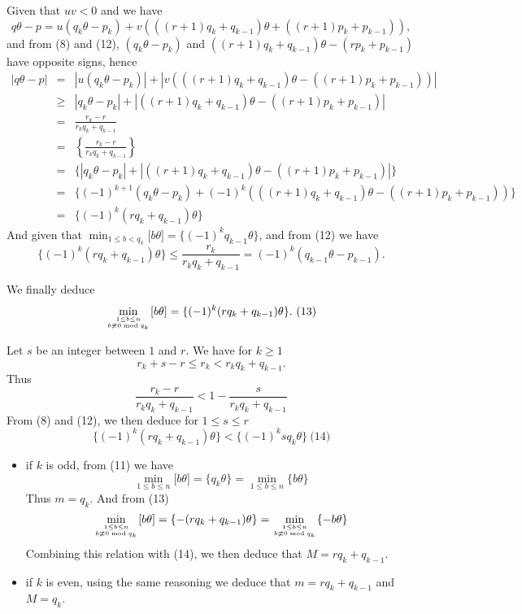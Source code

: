 \documentclass[a4paper,12pt]{article}
\begin{document}
Given that $uv<0$ and we have
\[ q\theta - p = u(q_k\theta - p_k) + v(((r+1)q_k+q_{k-1})\theta +
((r+1)p_k+ p_{k-1})),\]
and from (8) and (12), $(q_k\theta - p_k)$ and $((r+1)q_k+q_{k-1})\theta
- (rp_k + p_{k-1})$ have opposite signs, hence
\begin{eqnarray*}
  |q\theta - p| &=& |u(q_k\theta - p_k)| + |v(((r+1)q_k + q_{k-1})\theta -
  ((r+1)p_k + p_{k-1}))| \\
  &\ge& |q_k \theta - p_k| + |((r+1)q_k + q_{k-1})\theta - ((r+1)p_k +
  p_{k-1})| \\
  &=& \frac{r_k - r}{r_k q_k + q_{k-1}}\\
  &=& \left\{ \frac{r_k - r}{r_k q_k + q_{k-1}}\right\} \\
  &=& \{ |q_k \theta - p_k| + |((r+1)q_k + q_{k-1})\theta - ((r+1)p_k +
  p_{k-1})| \} \\
  &=& \{ (-1)^{k+1}(q_k\theta - p_k) + (-1)^k (((r+1)q_k +
  q_{k-1})\theta - ((r+1) p_k + p_{k-1}))\} \\
  &=& \{ (-1)^k(rq_k + q_{k-1})\theta\}
\end{eqnarray*}
And given that
$\min_{1\le b<q_k}\lbrack b\theta \rbrack = \{(-1)^{k}q_{k-1}\theta\}$,
and from (12) we have
\[ \{(-1)^k(rq_k + q_{k-1}) \theta\} \le \frac{r_k}{r_kq_k + q_{k-1}} =
(-1)^k (q_{k-1}\theta - p_{k-1}).\]

We finally deduce
\[ \min_{1\le b\le n\atop b \not\equiv 0 \bmod{q_k}}\lbrack
b\theta\rbrack = \{(-1)^k(rq_k + q_{k-1})\theta\}.\ (13)\]

Let $s$ be an integer between $1$ and $r$.  We have for $k\ge 1$
\[ r_k + s - r \le r_k < r_k q_k + q_{k-1}.\]
Thus
\[ \frac{r_k - r}{r_k q_k + q_{k-1}} < 1 - \frac{s}{r_k q_k +
  q_{k-1}}\]
From (8) and (12), we then deduce for $1\le s\le r$
\[ \{(-1)^k(r q_k + q_{k-1})\theta\} <
\{(-1)^ksq_k\theta\}\ \mbox{(14)}\]

\begin{itemize}
\item
  if $k$ is odd, from (11) we have
  \[ \min_{1\le b\le n}\lbrack b\theta \rbrack = \{q_k\theta\} =
  \min_{1\le b\le n}\{ b \theta\}\]
  Thus $m = q_k$.  And from (13)
  \[ \min_{1\le b\le n\atop b \not\equiv 0 \bmod{q_k}}\lbrack
  b\theta\rbrack = \{-(rq_k + q_{k-1})\theta\} = \min_{1\le b\le n\atop
    b \not\equiv 0\bmod{q_k}}\{ -b\theta\}\]
  Combining this relation with (14), we then deduce that $M = rq_k +
  q_{k-1}$.

\item
  if $k$ is even, using the same reasoning we deduce that $m = rq_k +
  q_{k-1}$ and $M = q_k$.
\end{itemize}
\end{document}
